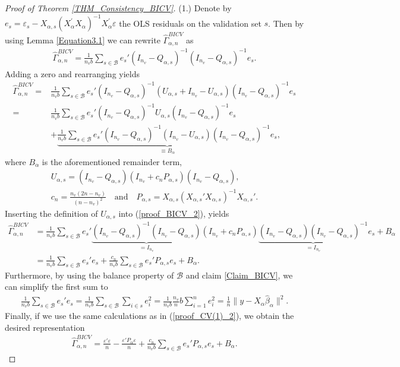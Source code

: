 \documentclass[Research_Module_ES.tex]{subfiles}
\begin{document}
\begin{proof}[Proof of Theorem \ref{THM_Consistency_BICV}]
	(1.) Denote by $e_s=\varepsilon_s-X_{\alpha,s}(X_\alpha^\prime X_\alpha)^{-1}X_\alpha^\prime\varepsilon$ the OLS residuals on the validation set $s$. Then by using Lemma \ref{Equation3.1} we can rewrite $\hat{\Gamma}_{\alpha,n}^{BICV}$ as
	\begin{align*}
	\hat{\Gamma}_{\alpha,n}^{BICV} = \frac{1}{n_vb}\sum_{s\in \mathcal{B}}e_s'(I_{n_v}-Q_{\alpha,s})^{-1}(I_{n_v}-Q_{\alpha,s})^{-1}e_s.
	\end{align*}
	Adding a zero and rearranging yields
	\begin{align}
	\hat{\Gamma}_{\alpha,n}^{BICV} = &\frac{1}{n_vb}\sum_{s\in \mathcal{B}}e_s'(I_{n_v}-Q_{\alpha,s})^{-1}(U_{\alpha,s} + I_{n_v}-U_{\alpha,s})(I_{n_v}-Q_{\alpha,s})^{-1}e_s\nonumber\\
	= &\frac{1}{n_vb}\sum_{s\in \mathcal{B}}e_s'(I_{n_v}-Q_{\alpha,s})^{-1}U_{\alpha,s}(I_{n_v}-Q_{\alpha,s})^{-1}e_s\label{proof_BICV_2}\\
	&+\underbrace{\frac{1}{n_vb}\sum_{s\in \mathcal{B}}e_s'(I_{n_v}-Q_{\alpha,s})^{-1}(I_{n_v}-U_{\alpha,s})(I_{n_v}-Q_{\alpha,s})^{-1}e_s}_{\equiv B_\alpha},\nonumber
	\end{align}
	where $B_\alpha$ is the aforementioned remainder term, 
	\begin{align*}
	U_{\alpha,s}=(I_{n_v}-Q_{\alpha,s})(I_{n_v}+c_n P_{\alpha,s})(I_{n_v}-Q_{\alpha,s}),\\
	c_n = \frac{n_v(2n-n_v)}{(n-n_v)^2}\quad \textrm{and} \quad
	P_{\alpha,s}= X_{\alpha,s}(X_{\alpha,s}'X_{\alpha,s})^{-1}X_{\alpha,s}'.
	\end{align*}
	Inserting the definition of $U_{\alpha,s}$ into (\ref{proof_BICV_2}), yields
	\begin{align}
	\hat{\Gamma}_{\alpha,n}^{BICV}&=\frac{1}{n_vb}\sum_{s\in \mathcal{B}}e_s'\underbrace{(I_{n_v}-Q_{\alpha,s})^{-1}(I_{n_v}-Q_{\alpha,s})}_{=I_{n_v}}(I_{n_v}+c_n P_{\alpha,s})\underbrace{(I_{n_v}-Q_{\alpha,s})(I_{n_v}-Q_{\alpha,s})^{-1}}_{=I_{n_v}}e_s +B_\alpha\nonumber\\
	&=\frac{1}{n_vb}\sum_{s\in \mathcal{B}}e_s'e_s + \frac{c_n}{n_vb}\sum_{s\in \mathcal{B}}e_s'P_{\alpha,s}e_s+B_\alpha.\label{motivation_APCV_1}
	\end{align}
	Furthermore, by using the balance property of $\mathcal{B}$ and claim \ref{Claim_BICV}, we can simplify the first sum to
	\begin{align}
	\frac{1}{n_vb}\sum_{s\in \mathcal{B}}e_s'e_s
	= \frac{1}{n_vb}\sum_{s\in \mathcal{B}}\sum_{i\in s}e_i^2 
	= \frac{1}{n_vb}\frac{n_v}{n}b \sum_{i=1}^ne_i^2 = \frac{1}{n}\lVert y-X_\alpha\hat{\beta}_\alpha\rVert^2.\label{motivation_APCV_2}
	\end{align}
	Finally, if we use the same calculations as in (\ref{proof_CV(1)_2}), we obtain the desired representation
	\begin{align*}
	\hat{\Gamma}_{\alpha,n}^{BICV} = \frac{\varepsilon'\varepsilon}{n}-\frac{\varepsilon'P_\alpha\varepsilon}{n}+\frac{c_n}{n_v b}\sum_{s\in \mathcal{B}}e_s'P_{\alpha,s}e_s+B_\alpha.
	\end{align*}
	

\end{proof}
\end{document}
